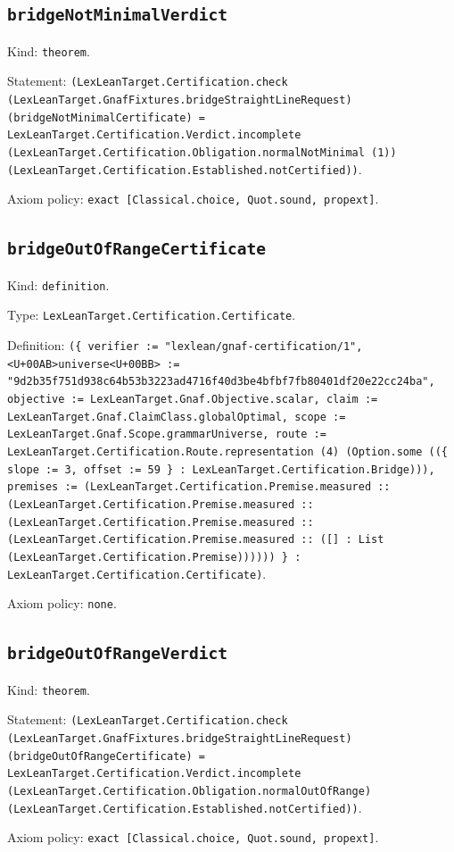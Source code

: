 \documentclass[11pt]{article}
\begin{document}
\subsection*{\texttt{bridgeNotMinimalVerdict}}
\noindent Kind: \texttt{theorem}.\par
\noindent Statement: \texttt{(LexLeanTarget.Certification.check (LexLeanTarget.GnafFixtures.bridgeStraightLineRequest) (bridgeNotMinimalCertificate) = LexLeanTarget.Certification.Verdict.incomplete (LexLeanTarget.Certification.Obligation.normalNotMinimal (1)) (LexLeanTarget.Certification.Established.notCertified))}.\par
\noindent Axiom policy: \texttt{exact [Classical.choice, Quot.sound, propext]}.\par
\subsection*{\texttt{bridgeOutOfRangeCertificate}}
\noindent Kind: \texttt{definition}.\par
\noindent Type: \texttt{LexLeanTarget.Certification.Certificate}.\par
\noindent Definition: \texttt{(\{ verifier := "lexlean/gnaf-certification/1", <U+00AB>universe<U+00BB> := "9d2b35f751d938c64b53b3223ad4716f40d3be4bfbf7fb80401df20e22cc24ba", objective := LexLeanTarget.Gnaf.Objective.scalar, claim := LexLeanTarget.Gnaf.ClaimClass.globalOptimal, scope := LexLeanTarget.Gnaf.Scope.grammarUniverse, route := LexLeanTarget.Certification.Route.representation (4) (Option.some ((\{ slope := 3, offset := 59 \} : LexLeanTarget.Certification.Bridge))), premises := (LexLeanTarget.Certification.Premise.measured :: (LexLeanTarget.Certification.Premise.measured :: (LexLeanTarget.Certification.Premise.measured :: (LexLeanTarget.Certification.Premise.measured :: ([] : List (LexLeanTarget.Certification.Premise)))))) \} : LexLeanTarget.Certification.Certificate)}.\par
\noindent Axiom policy: \texttt{none}.\par
\subsection*{\texttt{bridgeOutOfRangeVerdict}}
\noindent Kind: \texttt{theorem}.\par
\noindent Statement: \texttt{(LexLeanTarget.Certification.check (LexLeanTarget.GnafFixtures.bridgeStraightLineRequest) (bridgeOutOfRangeCertificate) = LexLeanTarget.Certification.Verdict.incomplete (LexLeanTarget.Certification.Obligation.normalOutOfRange) (LexLeanTarget.Certification.Established.notCertified))}.\par
\noindent Axiom policy: \texttt{exact [Classical.choice, Quot.sound, propext]}.\par
\end{document}
